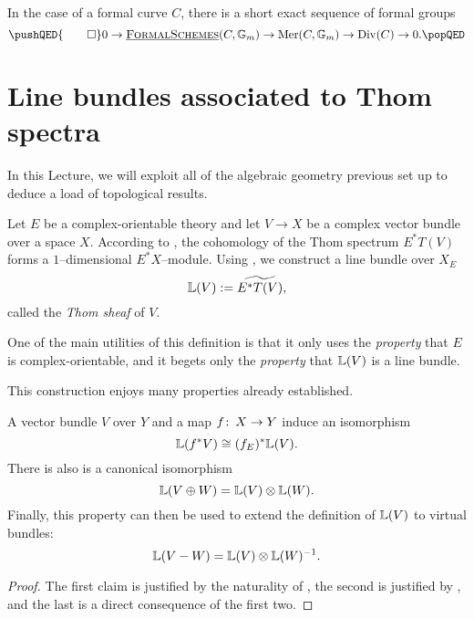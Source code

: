 \begin{theorem}
In the case of a formal curve \(C\), there is a short exact sequence of formal groups
\[\pushQED{\qed}
0 \to \InternalHom{FormalSchemes}(C, \mathbb G_m) \to \operatorname{Mer}(C, \mathbb G_m) \to \Div(C) \to 0. \qedhere
\popQED\]
\end{theorem}











\section{Line bundles associated to Thom spectra}\label{ProjectivizationLecture}

In this Lecture, we will exploit all of the algebraic geometry previous set up to deduce a load of topological results.

\begin{definition}\label{DefnThomSheaf}
Let \(E\) be a complex-orientable theory and let \(V \to X\) be a complex vector bundle over a space \(X\).  According to , the cohomology of the Thom spectrum \(E^* T(V)\) forms a \(1\)--dimensional \(E^* X\)--module.  Using , we construct a line bundle over \(X_E\) \[\mathbb{L}(V) := \widetilde{E^* T(V)},\] called the \textit{Thom sheaf} of \(V\).
\end{definition}

\begin{remark}
One of the main utilities of this definition is that it only uses the \emph{property} that \(E\) is complex-orientable, and it begets only the \emph{property} that \(\mathbb{L}(V)\) is a line bundle.
\end{remark}

This construction enjoys many properties already established.
\begin{corollary}\label{PropertiesOfThomSheaves}
A vector bundle \(V\) over \(Y\) and a map \(f \colon\thinspace X \to Y\) induce an isomorphism \[\mathbb{L}(f^* V) \cong (f_E)^* \mathbb{L}(V).\]  There is also is a canonical isomorphism \[\mathbb{L}(V \oplus W) = \mathbb{L}(V) \otimes \mathbb{L}(W).\]  Finally, this property can then be used to extend the definition of \(\mathbb{L}(V)\) to virtual bundles: \[\mathbb{L}(V - W) = \mathbb{L}(V) \otimes \mathbb{L}(W)^{-1}.\]
\end{corollary}
\begin{proof}
The first claim is justified by the naturality of , the second is justified by , and the last is a direct consequence of the first two.
\end{proof}

